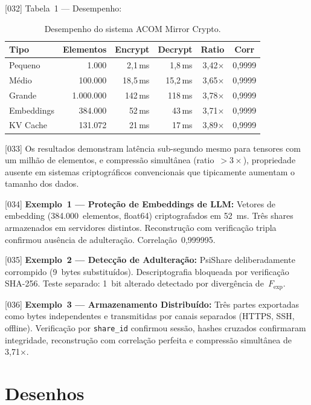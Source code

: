\documentclass[12pt,a4paper]{article}
\newcommand{\Fexp}{F_{\text{exp}}}
\begin{document}
{[032]} Tabela~1 --- Desempenho:

\begin{table}[H]
\centering
\caption{Desempenho do sistema ACOM Mirror Crypto.}
\label{tab:desempenho}
\begin{tabular}{lrrrrc}
\toprule
\textbf{Tipo} & \textbf{Elementos} & \textbf{Encrypt}
  & \textbf{Decrypt} & \textbf{Ratio}
  & \textbf{Corr} \\
\midrule
Pequeno    & 1.000     & 2,1\,ms  & 1,8\,ms  & 3,42$\times$ & 0,9999 \\
Médio      & 100.000   & 18,5\,ms & 15,2\,ms & 3,65$\times$ & 0,9999 \\
Grande     & 1.000.000 & 142\,ms  & 118\,ms  & 3,78$\times$ & 0,9999 \\
Embeddings & 384.000   & 52\,ms   & 43\,ms   & 3,71$\times$ & 0,9999 \\
KV Cache   & 131.072   & 21\,ms   & 17\,ms   & 3,89$\times$ & 0,9999 \\
\bottomrule
\end{tabular}
\end{table}

{[033]} Os resultados demonstram latência sub-segundo mesmo para
tensores com um milhão de elementos, e compressão simultânea
(ratio~$> 3\times$), propriedade ausente em sistemas
criptográficos convencionais que tipicamente aumentam o tamanho
dos dados.

{[034]} \textbf{Exemplo~1 --- Proteção de Embeddings de LLM:}
Vetores de embedding (384.000~elementos, float64) criptografados
em 52~ms. Três shares armazenados em servidores distintos.
Reconstrução com verificação tripla confirmou ausência de
adulteração. Correlação~0,999995.

{[035]} \textbf{Exemplo~2 --- Detecção de Adulteração:}
PsiShare deliberadamente corrompido (9~bytes substituídos).
Descriptografia bloqueada por verificação SHA-256. Teste
separado: 1~bit alterado detectado por divergência de~$\Fexp$.

{[036]} \textbf{Exemplo~3 --- Armazenamento Distribuído:} Três
partes exportadas como bytes independentes e transmitidas por
canais separados (HTTPS, SSH, offline). Verificação por
\texttt{share\_id} confirmou sessão, hashes cruzados confirmaram
integridade, reconstrução com correlação perfeita e compressão
simultânea de 3,71$\times$.

\newpage
\section{Desenhos}
\end{document}
